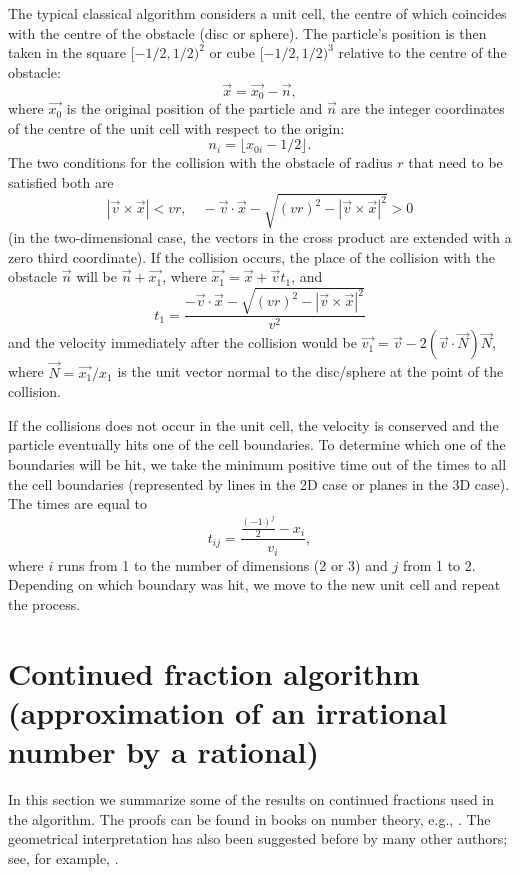 \documentclass{iopart}
\begin{document}
The typical classical algorithm considers a unit cell, the centre of which coincides with the centre of the obstacle (disc or sphere). The particle's position is then taken in the square $[-1/2, 1/2)^2$ or cube $[-1/2, 1/2)^3$ relative to the centre of the obstacle:
\begin{equation}
\vec{x} = \vec{x_0} - \vec{n} ,
\end{equation}
where $\vec{x_0}$ is the original position of the particle and $\vec{n}$ are the integer coordinates of the centre of the unit cell with respect to the origin:
\begin{equation}
n_i = \lfloor x_{0i} - 1/2 \rfloor.
\end{equation}
The two conditions for the collision with the obstacle of radius $r$ that need to be satisfied both are
\begin{equation}
| \vec{v} \times \vec{x} | < vr,  \quad - \vec{v} \cdot \vec{x} - \sqrt{(vr)^2 - | \vec{v} \times \vec{x} |^2} > 0
\end{equation}
(in the two-dimensional case, the vectors in the cross product are extended with a zero third coordinate). If the collision occurs, the place of the collision with the obstacle $\vec{n}$ will be $\vec{n} + \vec{x_1}$, where $\vec{x_1} = \vec{x} + \vec{v} t_1$, and
$$t_1 = \frac{- \vec{v} \cdot \vec{x} - \sqrt{(vr)^2 - | \vec{v} \times \vec{x} |^2}}{v^2}$$
and the velocity immediately after the collision would be $\vec{v_1} = \vec{v} - 2 (\vec{v} \cdot \vec{N}) \vec{N}$, where $\vec{N} = \vec{x_1}/x_1$ is the unit vector normal to the disc/sphere at the point of the collision.

If the collisions does not occur in the unit cell, the velocity is conserved and the particle eventually hits one of the cell boundaries. To determine which one of the boundaries will be hit, we take the minimum positive time out of the times to all the cell boundaries (represented by lines in the 2D case or planes in the 3D case). The times are equal to 
$$t_{ij} = \frac{\frac{(-1)^j}{2} - x_i}{v_i},$$
where $i$ runs from 1 to the number of dimensions (2 or 3) and $j$ from 1 to 2. Depending on which boundary was hit, we move to the new unit cell and repeat the process.


\section{Continued fraction algorithm (approximation of an irrational number by a rational)}

In this section we summarize some of the results on continued fractions used in the algorithm. The proofs can be found in books on number theory, e.g., 
\cite{niven2008introduction}. The geometrical interpretation has also been suggested before by many other authors; see, for example, \cite{nogueira1995three}. 
\end{document}
